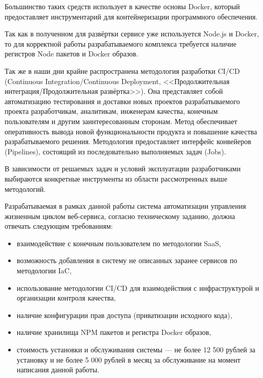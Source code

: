 Большинство таких средств использует в качестве основы Docker, который предоставляет инструментарий для контейнеризации программного обеспечения.

Так как в полученном для развёртки сервисе уже используется Node.js и Docker, то для корректной работы разрабатываемого комплекса требуется наличие регистров Node пакетов и Docker образов.

Так же в наши дни крайне распространена методология разработки CI/CD (Continuous Integration/Continuous Deployment, <<Продолжительная интеграция/Продолжительная развёртка>>).
Она представляет собой автоматизацию тестирования и доставки новых проектов разрабатываемого проекта разработчикам, аналитикам, инженерам качества, конечным пользователям и другим заинтересованным сторонам.
Метод обеспечивает оперативность вывода новой функциональности продукта и повышение качества разрабатываемого решения.
Методология предоставляет интерфейс конвейеров (Pipelines), состоящий из последовательно выполняемых задач (Jobs).

В зависимости от решаемых задач и условий эксплуатации разработчиками выбираются конкретные инструменты из области рассмотренных выше методологий.

Разрабатываемая в рамках данной работы система автоматизации управления жизненным циклом веб-сервиса,
согласно техническому заданию, должна отвечать следующим требованиям:

\begin{itemize}
    \item взаимодействие с конечным пользователем по методологии SaaS,
    \item возможность добавления в систему не описанных заранее сервисов по методологии IaC,
    \item использование методологии CI/CD для взаимодействия с инфраструктурой и организации контроля качества,
    \item наличие конфигурации прав доступа (приватизации исходного кода),
    \item наличие хранилища NPM пакетов и регистра Docker образов,
    \item стоимость установки и обслуживания системы --- не более 12 500 рублей за установку и не более 5 000 рублей в месяц за обслуживание на момент написания данной работы.
\end{itemize}
